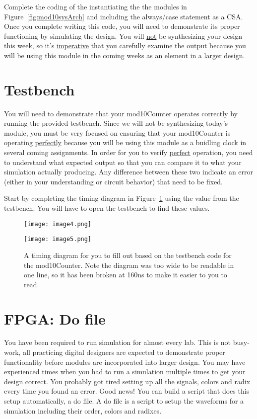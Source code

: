 \hypertarget{link:mod10Verilog}{}{}
Complete the coding of the  instantiating the
the modules in Figure~\ref{fig:mod10sysArch} and including the
always/case statement as a CSA.  Once you complete writing this
code, you will need to demonstrate its proper functioning by
simulating the design.  You will \underline{not} be synthesizing
your design this week, so it's \underline{imperative} that you carefully
examine the output because you will be using this module
in the coming weeks as an element in a larger design.

\section{Testbench}

You will need to demonstrate that your mod10Counter operates correctly
by running the provided testbench. Since we will not be synthesizing
today's module, you must be very focused on ensuring that your
mod10Counter is operating \underline{perfectly} because you will
be using this module as a buidling clock in several coming assignments.
In order for you to verify \underline{perfect} operation, you need to understand
what expected output so that you can compare it to what your simulation actually
producing. Any difference between these two indicate an error (either in
your understanding or circuit behavior) that need to be fixed.

Start by completing the timing diagram in Figure~\ref{fig:mod10TimingDiamgram}
using the value from the testbench.  You will have to open the testbench to
find these values.

\begin{landscape}
    \begin{figure}[ht]
        \texttt{[image: image4.png]}

        \texttt{[image: image5.png]}

        \caption{A timing diagram for you to fill out based on the testbench
            code for the mod10Counter. Note the diagram was too wide to be readable
            in one line, so it has been broken at 160ns to make it easier to
        you to read.}
        \label{fig:mod10TimingDiamgram}
    \end{figure}
\end{landscape}

\section{FPGA: Do file}
You have been required to run simulation for almost every lab. This is not
busy-work, all practicing digital designers are expected to demonstrate
proper functionality before modules are incorporated into larger design.
You may have experienced times when you had to run a simulation
multiple times to get your design correct.  You probably got tired setting
up all the signals, colors and radix every time you found an error.  Good
news! You can build a script that does this setup automatically, a do file.
A do file is a script to setup the waveforms for a simulation
including their order, colors and radixes.

